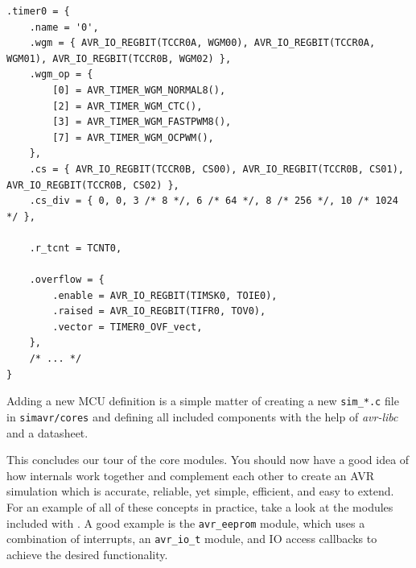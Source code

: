 \begin{lstlisting}
.timer0 = {
    .name = '0',
    .wgm = { AVR_IO_REGBIT(TCCR0A, WGM00), AVR_IO_REGBIT(TCCR0A, WGM01), AVR_IO_REGBIT(TCCR0B, WGM02) },
    .wgm_op = {
        [0] = AVR_TIMER_WGM_NORMAL8(),
        [2] = AVR_TIMER_WGM_CTC(),
        [3] = AVR_TIMER_WGM_FASTPWM8(),
        [7] = AVR_TIMER_WGM_OCPWM(),
    },
    .cs = { AVR_IO_REGBIT(TCCR0B, CS00), AVR_IO_REGBIT(TCCR0B, CS01), AVR_IO_REGBIT(TCCR0B, CS02) },
    .cs_div = { 0, 0, 3 /* 8 */, 6 /* 64 */, 8 /* 256 */, 10 /* 1024 */ },

    .r_tcnt = TCNT0,

    .overflow = {
        .enable = AVR_IO_REGBIT(TIMSK0, TOIE0),
        .raised = AVR_IO_REGBIT(TIFR0, TOV0),
        .vector = TIMER0_OVF_vect,
    },
    /* ... */
}
\end{lstlisting}

Adding a new \ac{MCU} definition is a simple matter of creating a new \verb|sim_*.c|
file in \verb|simavr/cores| and defining all included components with the help
of \emph{avr-libc} and a datasheet.

This concludes our tour of the \simavr core modules. You should now have a
good idea of how \simavr internals work together and complement each
other to create an \ac{AVR} simulation which is accurate, reliable, yet simple,
efficient, and easy to extend. For an example of all of these concepts in practice,
take a look at the modules included with \simavr. A good example is the \verb|avr_eeprom|
module, which uses a combination of interrupts, an \lstinline|avr_io_t| module,
and \ac{IO} access callbacks to achieve the desired functionality.

